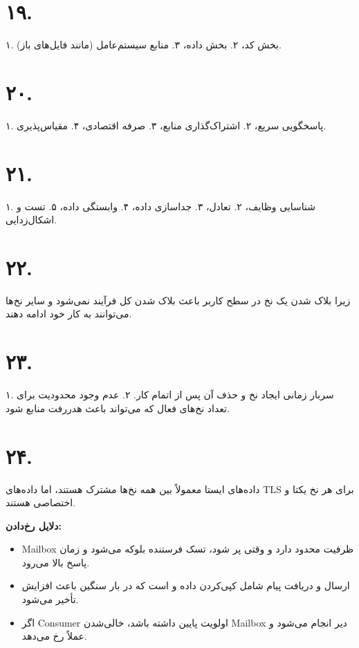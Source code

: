 \documentclass[12pt, answers]{exam}
\renewenvironment{solution}{%
  \par
  \begin{tcolorbox}[
    breakable,                
    colback=white,
    colframe=black,
    arc=1pt,
    boxrule=0.6pt,
    left=4mm, right=4mm,
    top=2mm, bottom=2mm,
    before skip=10pt,
    after skip=10pt,
    segmentation style={solid, black}, 
    before upper={\noindent\textbf{\color{blue}پاسخ:}\par\vspace{0.5em}}
  ]
 }
{%
  \end{tcolorbox}
  \vspace{1em}
}
\begin{document}
\begin{questions}
\begin{solution}
\begin{parts}
    \part{۱۹.} ۱. بخش کد، ۲. بخش داده، ۳. منابع سیستم‌عامل (مانند فایل‌های باز).
    \part{۲۰.} ۱. پاسخگویی سریع، ۲. اشتراک‌گذاری منابع، ۳. صرفه اقتصادی، ۴. مقیاس‌پذیری.
    \part{۲۱.} ۱. شناسایی وظایف، ۲. تعادل، ۳. جداسازی داده، ۴. وابستگی داده، ۵. تست و اشکال‌زدایی.
    \part{۲۲.} زیرا بلاک شدن یک نخ در سطح کاربر باعث بلاک شدن کل فرآیند نمی‌شود و سایر نخ‌ها می‌توانند به کار خود ادامه دهند.
    \part{۲۳.} ۱. سربار زمانی ایجاد نخ و حذف آن پس از اتمام کار. ۲. عدم وجود محدودیت برای تعداد نخ‌های فعال که می‌تواند باعث هدررفت منابع شود.
    \part{۲۴.} داده‌های ایستا معمولاً بین همه نخ‌ها مشترک هستند، اما داده‌های TLS برای هر نخ یکتا و اختصاصی هستند.
\end{parts}
    \end{solution}

    \pagebreak

    

    \begin{solution}
        \textbf{دلایل رخ‌دادن:}
        \begin{itemize}
            \item Mailbox ظرفیت محدود دارد و وقتی پر شود، تسک فرستنده بلوکه می‌شود و زمان پاسخ بالا می‌رود.
            \item ارسال و دریافت پیام شامل کپی‌کردن داده و  است که در بار سنگین باعث افزایش تأخیر می‌شود.
            \item اگر Consumer اولویت پایین داشته باشد، خالی‌شدن Mailbox دیر انجام می‌شود و عملاً  رخ می‌دهد.
        \end{itemize}


\end{solution}
\end{questions}
\end{document}
